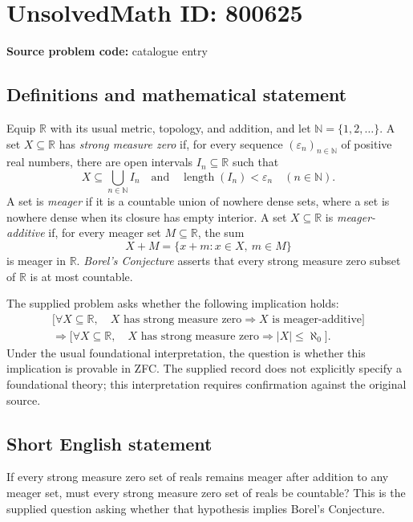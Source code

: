 \documentclass[11pt]{article}
\newcommand{\N}{\mathbb{N}}
\newcommand{\R}{\mathbb{R}}
\begin{document}
\section*{UnsolvedMath ID: 800625}
\textbf{Source problem code:} catalogue entry
\subsection{Definitions and mathematical statement}
Equip \(\R\) with its usual metric, topology, and addition, and let \(\N=\{1,2,\ldots\}\). A set \(X\subseteq\R\) has \emph{strong measure zero} if, for every sequence \((\varepsilon_n)_{n\in\N}\) of positive real numbers, there are open intervals \(I_n\subseteq\R\) such that
\[
X\subseteq\bigcup_{n\in\N} I_n
\quad\text{and}\quad
\operatorname{length}(I_n)<\varepsilon_n\quad(n\in\N).
\]
A set is \emph{meager} if it is a countable union of nowhere dense sets, where a set is nowhere dense when its closure has empty interior. A set \(X\subseteq\R\) is \emph{meager-additive} if, for every meager set \(M\subseteq\R\), the sum
\[
X+M=\{x+m:x\in X,\ m\in M\}
\]
is meager in \(\R\). \emph{Borel's Conjecture} asserts that every strong measure zero subset of \(\R\) is at most countable.

The supplied problem asks whether the following implication holds:
\[
\begin{gathered}
\bigl[\forall X\subseteq\R,\quad
X\text{ has strong measure zero}
\Longrightarrow X\text{ is meager-additive}\bigr]
\\[2pt]
\Longrightarrow
\bigl[\forall X\subseteq\R,\quad
X\text{ has strong measure zero}
\Longrightarrow |X|\leq\aleph_0\bigr].
\end{gathered}
\]
Under the usual foundational interpretation, the question is whether this implication is provable in ZFC. The supplied record does not explicitly specify a foundational theory; this interpretation requires confirmation against the original source.
\subsection{Short English statement}
If every strong measure zero set of reals remains meager after addition to any meager set, must every strong measure zero set of reals be countable? This is the supplied question asking whether that hypothesis implies Borel's Conjecture.
\end{document}
